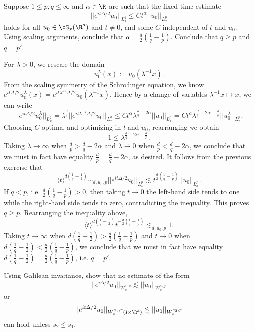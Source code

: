 \begin{statement}
	Suppose $1 \leq p, q \leq \infty$ and $\alpha \in \R$ are such that the fixed time estimate
		\[ ||e^{it \Delta/2} u_0||_{L^q_x} \leq C t^\alpha ||u_0||_{L^p_x} \]
	holds for all $u_0 \in \cS_x (\R^d)$ and $t \neq 0$, and some $C$ independent of $t$ and $u_0$. Using scaling arguments, conclude that $\alpha = \frac{d}{2} (\frac1q - \frac1p)$. Conclude that $q \geq p$ and $q = p'$. 
\end{statement}


\begin{solution}
	For $\lambda > 0$, we rescale the domain
		\[ u_0^\lambda (x) := u_0 (\lambda^{-1} x). \]
	From the scaling symmetry of the Schrodinger equation, we know $e^{it\Delta/2} u_0^\lambda (x) = e^{it\lambda^{-2} \Delta/2}	 u_0 (\lambda^{-1} x)$. Hence by a change of variables $\lambda^{-1} x \mapsto x$, we can write
		\[ ||e^{it\Delta/2} u_0^\lambda||_{L^q_x} = \lambda^{\frac{d}{q}} ||e^{i t \lambda^{-2} \Delta/2} u_0||_{L^q_x} \leq C t^{\alpha} \lambda^{\frac{d}{q}-2 \alpha} ||u_0||_{L^p_x} =  C t^{\alpha} \lambda^{\frac{d}{q}-2 \alpha - \frac{d}{p}} ||u_0^\lambda||_{L^p_x}. \]
	Choosing $C$ optimal and optimizing in $t$ and $u_0$, rearranging we obtain
		\[ 1 \leq \lambda^{\frac{d}{q}-2 \alpha - \frac{d}{p}}. \]	
	Taking $\lambda \to \infty$ when $\frac{d}{p} > \frac{d}{q} - 2 \alpha$ and $\lambda \to 0$ when $\frac{d}{p} < \frac{d}{q} - 2 \alpha$, we conclude that we must in fact have equality $\frac{d}{p} = \frac{d}{q} - 2 \alpha$, as desired. It follows from the previous exercise that
		\[ \langle t \rangle^{d (\frac1q - \frac12)} \sim_{d, u_0, p} ||e^{it \Delta/2} u_0 ||_{L^p_x} \lesssim t^{\frac{d}{2} (\frac1q - \frac1p)} ||u_0||_{L^p_x}. \]
	If $q < p$, i.e.  $\frac{d}{2} (\frac1q - \frac1p) > 0$, then taking $t \to 0$ the left-hand side tends to one while the right-hand side tends to zero, contradicting the inequality. This proves $q \geq p$. Rearranging the inequality above, 
		\[ \langle t \rangle^{d (\frac1q - \frac12)}t^{-\frac{d}{2} (\frac1q - \frac1p)} \lesssim_{d, u_0, p} 1.\]
	Taking $t \to \infty$ when 	$d (\frac1q - \frac12) > \frac{d}{2} (\frac1q - \frac1p)$ and $t \to 0$ when $d (\frac1q - \frac12) < \frac{d}{2} (\frac1q - \frac1p)$, we conclude that we must in fact have equality $d (\frac1q - \frac12) = \frac{d}{2} (\frac1q - \frac1p)$, i.e. $q = p'$. 
\end{solution}

\begin{statement}
	Using Galilean invariance, show that no estimate of the form 
		\[ ||e^{i \Delta/2} u_0||_{W^{s_1, q}_x} \lesssim ||u_0||_{W^{s_2, p}_x} \]
	or 
		\[ ||e^{i t\Delta/2} u_0||_{W^{s_1, r}_x (I \times \R^d)} \lesssim ||u_0||_{W^{s_2, p}_x} \]
	can hold unless $s_2 \leq s_1$. 	
\end{statement}


